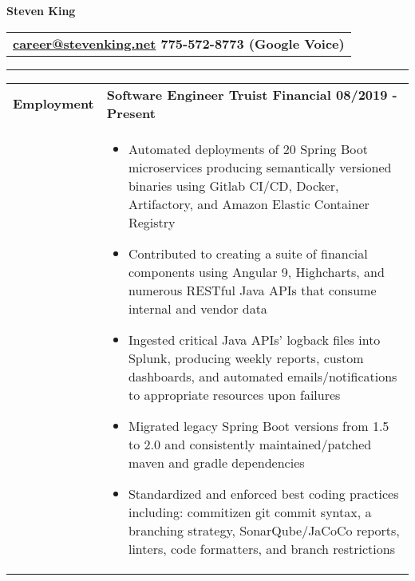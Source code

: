 \documentclass[final]{letter}
\begin{document}
	\begin{center}
		{\fontsize{36}{64}\selectfont\bf{Steven King}} \hspace{.18cm} {
			\begin{tabular}{c}\large\bf{\href{mailto:career@stevenking.net}{career@stevenking.net} \hspace{.2cm} 775-572-8773 (Google Voice)} \end{tabular}}
		
		\rule{.99\textwidth}{1pt}	

		\begin{tabularx}{\linewidth}{>{\raggedright\bf\Large{}}p{10.75em}X} Employment 
			& \large\bf{Software Engineer \hfill {Truist Financial} \hfill 08/2019 - Present } \\
			& \begin{itemize}[noitemsep,topsep=0pt]\setlength\itemsep{2px}
				\item Automated deployments of 20 Spring Boot microservices producing semantically versioned binaries using Gitlab CI/CD, Docker, Artifactory, and Amazon Elastic Container Registry
				\item Contributed to creating a suite of financial components using Angular 9, Highcharts, and numerous RESTful Java APIs that consume internal and vendor data
				\item Ingested critical Java APIs' logback files into Splunk, producing weekly reports, custom dashboards, and automated emails/notifications to appropriate resources upon failures
				\item Migrated legacy Spring Boot versions from 1.5 to 2.0 and consistently maintained/patched maven and gradle dependencies
				\item Standardized and enforced best coding practices including: commitizen git commit syntax, a branching strategy, SonarQube/JaCoCo reports, linters, code formatters, and branch restrictions
			\end{itemize} \\
		

\end{tabularx}
\end{center}
\end{document}
